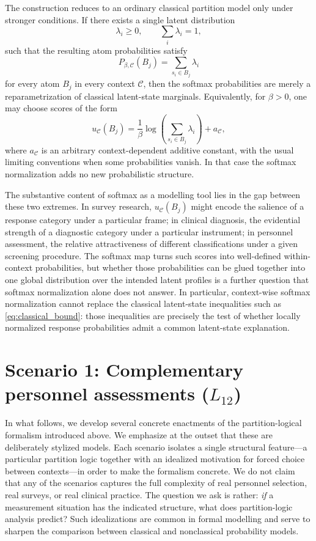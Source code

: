 \documentclass[aps,pra,twocolumn,superscriptaddress,floatfix,longbibliography]{revtex4-2}
\begin{document}
The construction reduces to an ordinary classical partition model
only under stronger conditions. If there exists a single latent
distribution
\[
\lambda_i\geq 0,\qquad \sum_i\lambda_i=1,
\]
such that the resulting atom probabilities satisfy
\[
P_{\beta,\mathcal C}(B_j)
=
\sum_{s_i\in B_j}\lambda_i
\]
for every atom \(B_j\) in every context \(\mathcal C\), then the
softmax probabilities are merely a reparametrization of classical
latent-state marginals. Equivalently, for \(\beta>0\), one may choose
scores of the form
\[
u_{\mathcal C}(B_j)
=
\frac{1}{\beta}\log\!\left(\sum_{s_i\in B_j}\lambda_i\right)
+
a_{\mathcal C},
\]
where \(a_{\mathcal C}\) is an arbitrary context-dependent additive
constant, with the usual limiting conventions when some probabilities
vanish. In that case the softmax normalization adds no new
probabilistic structure.

The substantive content of softmax as a modelling tool lies in the
gap between these two extremes. In survey research,
\(u_{\mathcal C}(B_j)\) might encode the salience of a response
category under a particular frame; in clinical diagnosis, the
evidential strength of a diagnostic category under a particular
instrument; in personnel assessment, the relative attractiveness of
different classifications under a given screening procedure. The
softmax map turns such scores into well-defined within-context
probabilities, but whether those probabilities can be glued together
into one global distribution over the intended latent profiles is a
further question that softmax normalization alone does not answer. In
particular, context-wise softmax normalization cannot replace the
classical latent-state inequalities such as
\eqref{eq:classical_bound}: those inequalities are precisely the test
of whether locally normalized response probabilities admit a common
latent-state explanation.

\section{Scenario 1: Complementary personnel assessments ($L_{12}$)}
\label{sec:personnel}

In what follows, we develop several concrete enactments of the
partition-logical formalism introduced above. We emphasize at the
outset that these are deliberately stylized models. Each scenario
isolates a single structural feature---a particular partition logic
together with an idealized motivation for forced choice between
contexts---in order to make the formalism concrete. We do not claim
that any of the scenarios captures the full complexity of real
personnel selection, real surveys, or real clinical practice. The
question we ask is rather: \emph{if} a measurement situation has the
indicated structure, what does partition-logic analysis predict?
Such idealizations are common in formal modelling and serve to
sharpen the comparison between classical and nonclassical
probability models.
\end{document}
